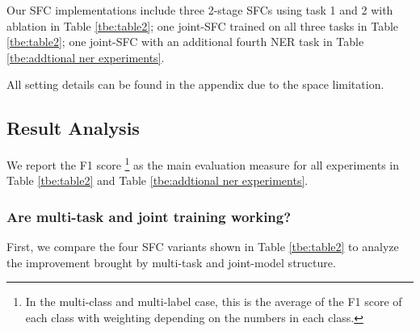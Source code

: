 Our SFC implementations include three 2-stage SFCs using task 1 and 2 with ablation in Table \ref{tbe:table2}; one joint-SFC trained on all three tasks in Table \ref{tbe:table2}; one joint-SFC with an additional fourth NER task in Table \ref{tbe:addtional ner experiments}. 

All setting details can be found in the appendix due to the space limitation.

\subsection{Result Analysis}
We report the F1 score \footnote{In the multi-class and multi-label case, this
is the average of the F1 score of each class with weighting depending on the
numbers in each class.} as the main evaluation measure for all experiments in
Table \ref{tbe:table2} and Table \ref{tbe:addtional ner experiments}.

\subsubsection*{Are multi-task and joint training working?} 
First, we compare the four SFC variants shown in Table \ref{tbe:table2} to analyze the improvement
brought by multi-task and joint-model structure. 

